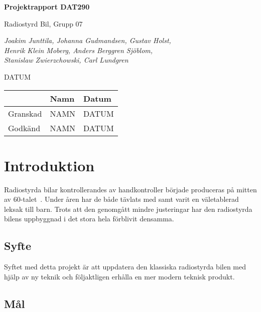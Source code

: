 \documentclass[a4paper]{article}
\begin{document}
\begin{titlepage}
\centering
{\bfseries\huge Projektrapport DAT290}

\vspace{10mm}

{\Large Radiostyrd Bil, Grupp 07}

\vspace{20mm}

{\Large \itshape{Joakim Junttila, Johanna Gudmandsen, Gustav Holst,\\Henrik Klein Moberg, Anders Berggren Sjöblom, \\[1mm] Stanislaw Zwierzchowski, Carl Lundgren}}

\vspace{10mm}

{DATUM}


\normalsize{
\begin{table}[b]
\centering
\begin{tabular}{|l|l|l|}  \hline
          & \bf Namn & \bf Datum   \\ \hline \hline
 Granskad & NAMN     & DATUM        \\ \hline
 Godkänd  & NAMN     & DATUM         \\ \hline
  \end{tabular}  
  \end{table}}
\end{titlepage}

\tableofcontents


\newpage
\section{Introduktion}

Radiostyrda bilar kontrollerandes av handkontroller började produceras på mitten av 60-talet~\cite{RCHistory}. Under åren har de både tävlats med samt varit en väletablerad leksak till barn. Trots att den genomgått mindre justeringar har den radiostyrda bilens uppbyggnad i det stora hela förblivit densamma.

\subsection{Syfte}

Syftet med detta projekt är att uppdatera den klassiska radiostyrda bilen med hjälp av ny teknik och följaktligen erhålla en mer modern teknisk produkt.

\subsection{Mål}
\end{document}
